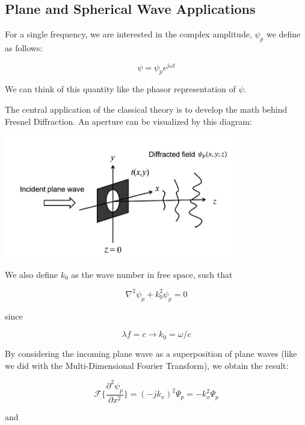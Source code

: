 \documentclass[12pt]{article}
\begin{document}
\subsection{Plane and Spherical Wave Applications}

For a single frequency, we are interested in the complex amplitude, \(\psi_{p}\) we define as follows:

\begin{equation}
	\psi = \psi_{p}e^{j \omega t}
\end{equation}

We can think of this quantity like the phasor representation of \(\psi\).

The central application of the classical theory is to develop the math behind Fresnel Diffraction. An aperture can be visualized by this diagram:
\begin{center}
\includegraphics[width=100mm]{tupac5.png}
\end{center}

We also define \(k_{0}\) as the wave number in free space, such that

\begin{equation}
	\nabla^2\psi_{p} + k_{0}^2\psi_{p} = 0
\end{equation}

since

\begin{equation}
	\lambda f = c \rightarrow k_{0} = \omega/c
\end{equation}

By considering the incoming plane wave as a superposition of plane waves (like we did with the Multi-Dimensional Fourier Transform), we obtain the result:

\begin{equation}
	\mathscr{F} \Big\{ \frac{\partial^2 \psi_{p}}{\partial x^2} \Big\} = (-jk_{x})^2\Psi_{p} = -k_{x}^2\Psi_{p}
\end{equation}

and
\end{document}
